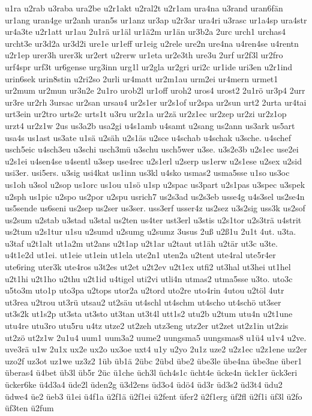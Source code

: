 {u1ra
u2rab
u3raba
ura2be
u2r1akt
u2ral2t
u2r1am
ura4na
u3rand
uran6fän
ur1ang
uran4ge
ur2anh
uran5s
ur1anz
ur3ap
u2r3ar
ura4ri
u3rasc
ur1a4sp
ura4str
ur4a3te
u2r1att
ur1au
2u1rä
ur1äl
ur1ä2m
ur1än
ur3b2a
2urc
urch1
urchas4
urcht3e
ur3d2a
ur3d2i
ure1e
ur1eff
ur1eig
u2rele
ure2n
ure4na
u4ren4se
u4rentn
u2r1ep
urer3h
urer3k
ur2ert
u2rerw
ur1eta
ur2e3th
ure3u
2urf
ur2f3l
ur2fro
urf4spr
urf3t
ur6gense
urg3inn
urg1l
ur2gla
ur2gri
uri2c
ur1ide
uri3en
u2r1ind
urin6sek
urin8stin
u2ri2so
2urli
ur4matt
ur2m1au
urm2ei
ur4mern
urmet1
ur2mum
ur2mun
ur3n2e
2u1ro
urob2l
ur1off
uroh2
uros4
urost2
2u1rö
ur3p4
2urr
ur3re
ur2rh
3ursac
ur2san
ursau4
ur2s1er
ur2s1of
ur2spa
ur2sun
urt2
2urta
ur4tai
urt3ein
ur2tro
urts2c
urts1t
u3ru
ur2z1a
ur2zä
ur2z1ec
ur2zep
ur2zi
ur2z1op
urzt4
ur2z1w
2us
us3a2b
usa2gi
u4s1amb
u4samt
u2sang
us2ann
us3ark
us5art
usa4s
us1ast
us3ate
u1sä
u2säh
u2s1äs
u2sce
u4schab
u4schak
u3sche.
u4schef
usch5eic
u4sch3eu
u3schi
usch3mü
u3schu
usch5wer
u3se.
u3s2e3b
u2s1ec
use2ei
u2s1ei
u4sen4se
u4sentl
u3sep
use4rec
u2s1erl
u2serp
us1erw
u2s1ese
u2sex
u2sid
usi3er.
usi5ers.
u3sig
usi4kat
us1inn
us3kl
u4sko
usmas2
usma5sse
u1so
us3oc
us1oh
u3sol
u2sop
us1orc
us1ou
u1sö
u1sp
u2spac
us3part
u2s1pas
u3spec
u3spek
u2sph
us1pic
u2spo
us2por
u2spu
usrich7
us2s3ad
us2s3eb
usse4g
u4s3sel
us2se4n
us5sende
us6seni
us2sep
us2ser
us3ser.
uss3erf
usser4z
us2sez
u3s2sig
uss3k
us2sof
us2sum
u2stab
u3stad
u3stal
us2ten
us4ter
ust3erl
u3stis
u2s1tor
u2s3trä
u4strit
us2tum
u2s1tur
u1su
u2sumd
u2sumg
u2sumz
3usus
2uß
u2ß1u
2u1t
4ut.
u3ta.
u3taf
u2t1alt
ut1a2m
ut2ans
u2t1ap
u2t1ar
u2taut
ut1äh
u2tär
ut3c
u3te.
u4t1e2d
ut1ei.
ut1eie
ut1ein
ut1ela
ute2n1
uten2a
u2tent
ute4ral
ute5r4er
ute6ring
uter3k
ute4ros
u3t2es
ut2et
u2t2ev
u2t1ex
utfi2
ut3hal
ut3hei
ut1hel
u2t1hi
u2t1ho
u2thu
u2t1id
u4tigel
uti2vi
utli4n
utmas2
utma5sse
u3to.
uto3c
u5to3m
uto1p
uto3pa
u2tops
utor2a
u2tord
uto2re
uto4rin
4utou
u2töl
4utr
ut3rea
u2trou
ut3rü
utsau2
ut2säu
ut4schl
ut4schm
ut4scho
ut4schö
ut3ser
ut3s2k
ut1s2p
ut3sta
ut3sto
ut3tan
ut3t4l
utt1s2
utu2b
u2tum
utu4n
u2t1une
utu4re
utu3ro
utu5ru
u4tz
utze2
ut2zeh
utz3eng
utz2er
ut2zet
ut2z1in
ut2zis
ut2zö
ut2z1w
2u1u4
uum1
uum3a2
uume2
uungsma5
uungsmas8
u1ü4
u1v4
u2ve.
uve3rä
u1w
2u1x
ux2e
ux2o
ux3oe
uxt4
u1y
u2yo
2u1z
uze2
u2z1ec
u2z1ene
uz2er
uzo2f
uz3ot
uz1we
uz3z2
1üb
üb1ä
2übc
2übd
übe2
übe3le
übe4na
übe3ne
über1
überas4
ü4bet
üb3l
üb5r
2üc
ü1che
üch3l
üch4s1c
ücht4e
ücke4n
ück1er
ück3eri
ücker6ke
ü4d3a4
üde2l
üden2g
ü3d2ens
üd3o4
üdö4
üd3r
üd3s2
üd3t4
üdu2
üdwe4
üe2
üeb3
ü1ei
ü4f1a
ü2f1ä
ü2f1ei
ü2fent
üfer2
ü2f1erg
üf2fl
ü2f1i
üf3l
ü2fo
üf3ten
ü2fum
}
